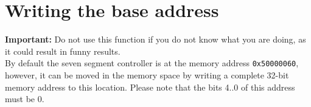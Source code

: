\documentclass[a4paper,twoside,12pt]{article}
\begin{document}
\section{Writing the base address}
\textbf{Important:} Do not use this function if you do not know what you are doing, as it could result in funny results.\\
By default the seven segment controller is at the memory address \texttt{0x50000060}, however, it can be moved in the memory space by writing a complete 32-bit memory address to this location. Please note
that the bits 4..0 of this address must be 0.
\end{document}
